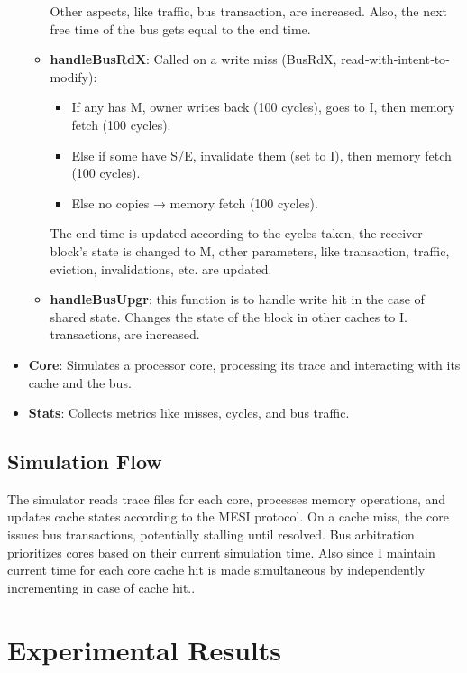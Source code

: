 \documentclass{article}
\begin{document}
\begin{itemize}
\begin{itemize}
\begin{itemize}
        \end{itemize}
        Other aspects, like traffic, bus transaction, are increased. Also, the next free time of the bus gets equal to the end time.
        \item \textbf{handleBusRdX}: Called on a write miss (BusRdX, read‐with‐intent‐to‐modify):
        \begin{itemize}
            \item If any has M, owner writes back (100 cycles), goes to I, then memory fetch (100 cycles).
            \item Else if some have S/E, invalidate them (set to I), then memory fetch (100 cycles).
            \item Else no copies → memory fetch (100 cycles).
        \end{itemize}
        The end time is updated according to the cycles taken, the receiver block's state is changed to M, other parameters, like transaction, traffic, eviction, invalidations, etc. are updated.
        \item \textbf{handleBusUpgr}: this function is to handle write hit in the case of shared state. Changes the state of the block in other caches to I.  transactions, are increased.
    \end{itemize}
    \item \textbf{Core}: Simulates a processor core, processing its trace and interacting with its cache and the bus.
    \item \textbf{Stats}: Collects metrics like misses, cycles, and bus traffic.
    
\end{itemize}

\subsection{Simulation Flow}

The simulator reads trace files for each core, processes memory operations, and updates cache states according to the MESI protocol. On a cache miss, the core issues bus transactions, potentially stalling until resolved. Bus arbitration prioritizes cores based on their current simulation time. Also since I maintain current time for each core cache hit is made simultaneous by independently incrementing in case of cache hit..

\section{Experimental Results}
\end{document}
